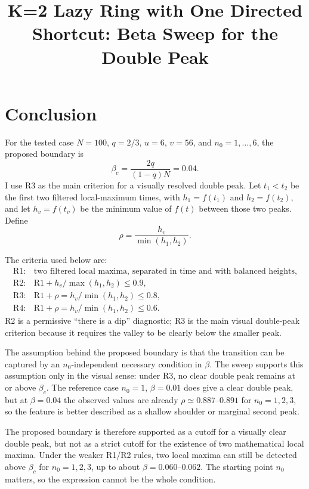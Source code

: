 \documentclass[10pt]{article}
\title{\vspace{-1.2cm}K=2 Lazy Ring with One Directed Shortcut: Beta Sweep for the Double Peak}
\author{}
\date{}
\begin{document}
\maketitle
\vspace{-1.2cm}

\section*{Conclusion}
For the tested case
$N=100$, $q=2/3$, $u=6$, $v=56$, and $n_0=1,\ldots,6$, the proposed boundary is
\[
  \beta_c=\frac{2q}{(1-q)N}=0.04.
\]
I use R3 as the main criterion for a visually resolved double peak.  Let
$t_1<t_2$ be the first two filtered local-maximum times, with
$h_1=f(t_1)$ and $h_2=f(t_2)$, and let $h_v=f(t_v)$ be the minimum value of
$f(t)$ between those two peaks.  Define
\[
  \rho=\frac{h_v}{\min(h_1,h_2)}.
\]

The criteria used below are:
\[
\begin{array}{ll}
\mathrm{R1}: & \text{two filtered local maxima, separated in time and with balanced heights},\\
\mathrm{R2}: & \mathrm{R1}+h_v/\max(h_1,h_2)\leq0.9,\\
\mathrm{R3}: & \mathrm{R1}+\rho=h_v/\min(h_1,h_2)\leq0.8,\\
\mathrm{R4}: & \mathrm{R1}+\rho=h_v/\min(h_1,h_2)\leq0.6.
\end{array}
\]
R2 is a permissive ``there is a dip'' diagnostic; R3 is the main visual
double-peak criterion because it requires the valley to be clearly below the
smaller peak.

The assumption behind the proposed boundary is that the transition can be
captured by an $n_0$-independent necessary condition in $\beta$.  The sweep
supports this assumption only in the visual sense: under R3, no clear double
peak remains at or above $\beta_c$.  The reference case $n_0=1$,
$\beta=0.01$ does give a clear double peak, but at $\beta=0.04$ the observed
values are already $\rho\simeq0.887$--$0.891$ for $n_0=1,2,3$, so the feature
is better described as a shallow shoulder or marginal second peak.

The proposed boundary is therefore supported as a cutoff for a visually clear
double peak, but not as a strict cutoff for the existence of two mathematical
local maxima.  Under the weaker R1/R2 rules, two local maxima can still be
detected above $\beta_c$ for $n_0=1,2,3$, up to about
$\beta=0.060$--$0.062$.  The starting point $n_0$ matters, so the expression
cannot be the whole condition.
\end{document}

